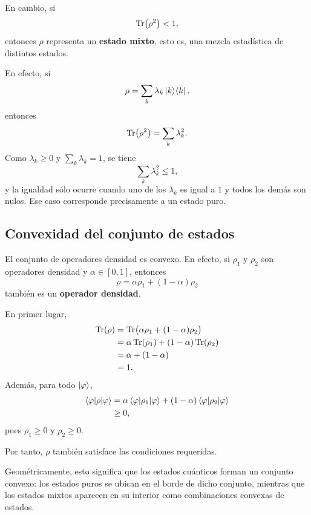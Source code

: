 \documentclass[../main.tex]{subfiles}
\begin{document}
En cambio, si
\begin{equation*}
    \Tr(\rho^2)<1,
\end{equation*}
entonces $\rho$ representa un \textbf{estado mixto}, esto es, una mezcla estadística de distintos estados.

En efecto, si
\begin{equation*}
    \rho=\sum_k \lambda_k \ket{k}\!\bra{k},
\end{equation*}
entonces
\begin{equation*}
    \Tr(\rho^2)=\sum_k \lambda_k^2.
\end{equation*}
Como $\lambda_k\geq 0$ y $\sum_k\lambda_k=1$, se tiene
\begin{equation*}
    \sum_k \lambda_k^2 \leq 1,
\end{equation*}
y la igualdad sólo ocurre cuando uno de los $\lambda_k$ es igual a $1$ y todos los demás son nulos. Ese caso corresponde precisamente a un estado puro.

\subsection*{Convexidad del conjunto de estados}

El conjunto de operadores densidad es convexo. En efecto, si $\rho_1$ y $\rho_2$ son operadores densidad y $\alpha\in[0,1]$, entonces
\begin{equation*}
    \rho = \alpha \rho_1 + (1-\alpha)\rho_2
\end{equation*}
también es un \textbf{operador densidad}.

En primer lugar,
\begin{align*}
    \Tr(\rho)
    &= \Tr\bigl(\alpha \rho_1 + (1-\alpha)\rho_2\bigr) \\
    &= \alpha \Tr(\rho_1) + (1-\alpha)\Tr(\rho_2) \\
    &= \alpha + (1-\alpha) \\
    &= 1.
\end{align*}
Además, para todo $\ket{\varphi}$,
\begin{align*}
    \braket{\varphi|\rho|\varphi}
    &= \alpha \braket{\varphi|\rho_1|\varphi}
    + (1-\alpha)\braket{\varphi|\rho_2|\varphi} \\
    &\geq 0,
\end{align*}
pues $\rho_1\geq 0$ y $\rho_2\geq 0$.

Por tanto, $\rho$ también satisface las condiciones requeridas.

Geométricamente, esto significa que los estados cuánticos forman un conjunto convexo: los estados puros se ubican en el borde de dicho conjunto, mientras que los estados mixtos aparecen en su interior como combinaciones convexas de estados.
\end{document}
